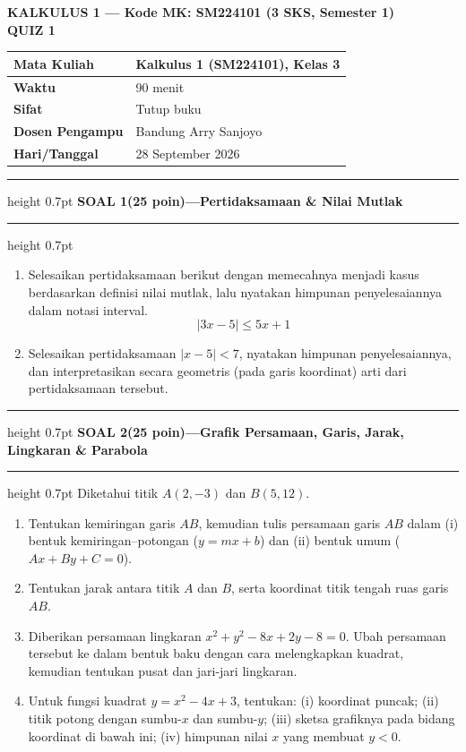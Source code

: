 \documentclass[11pt,a4paper]{article}
\newcommand{\judulsoal}[2]{%
  \par\addvspace{9pt}\hrule height 0.7pt
  \vspace{3pt}\textbf{SOAL #1\quad(25 poin)\quad---\quad #2}\par
  \vspace{2pt}\hrule height 0.7pt\vspace{4pt}}
\begin{document}
\thispagestyle{soal}
\begingroup
\fontsize{11}{13.5}\selectfont
{}
\setlength{\abovedisplayskip}{5pt}
\setlength{\belowdisplayskip}{5pt}

\begin{center}
  \textbf{KALKULUS 1 --- Kode MK: SM224101 (3 SKS, Semester 1)}\\[3pt]
  {\Large\textbf{QUIZ 1}}
\end{center}
\vspace{-5pt}
{\renewcommand{\arraystretch}{1.18}
  \begin{tabular}{|>{\bfseries}p{39mm}|p{\dimexpr\textwidth-39mm-4\tabcolsep-3\arrayrulewidth\relax}|}
    \hline
    Mata Kuliah    & Kalkulus 1 (SM224101), Kelas 3 \\ \hline
    Waktu          & 90 menit                       \\ \hline
    Sifat          & Tutup buku                     \\ \hline
    Dosen Pengampu & Bandung Arry Sanjoyo           \\ \hline
    Hari/Tanggal   & 28 September 2026              \\ \hline
  \end{tabular}}

\judulsoal{1}{Pertidaksamaan \& Nilai Mutlak}
\begin{enumerate}
  \item Selesaikan pertidaksamaan berikut dengan memecahnya menjadi kasus berdasarkan definisi nilai mutlak, lalu nyatakan himpunan penyelesaiannya dalam notasi interval.
        \[
          |3x-5|\le 5x+1
        \]
  \item Selesaikan pertidaksamaan $|x-5|<7$, nyatakan himpunan penyelesaiannya, dan interpretasikan secara geometris (pada garis koordinat) arti dari pertidaksamaan tersebut.
\end{enumerate}

\judulsoal{2}{Grafik Persamaan, Garis, Jarak, Lingkaran \& Parabola}
Diketahui titik $A(2,-3)$ dan $B(5,12)$.
\begin{enumerate}
  \item Tentukan kemiringan garis $AB$, kemudian tulis persamaan garis $AB$ dalam (i) bentuk kemiringan--potongan ($y=mx+b$) dan (ii) bentuk umum ($Ax+By+C=0$).
  \item Tentukan jarak antara titik $A$ dan $B$, serta koordinat titik tengah ruas garis $AB$.
  \item Diberikan persamaan lingkaran $x^2+y^2-8x+2y-8=0$.
        Ubah persamaan tersebut ke dalam bentuk baku dengan cara melengkapkan kuadrat, kemudian tentukan pusat dan jari-jari lingkaran.
  \item Untuk fungsi kuadrat $y=x^2-4x+3$, tentukan:
        (i) koordinat puncak; (ii) titik potong dengan sumbu-$x$ dan sumbu-$y$;
        (iii) sketsa grafiknya pada bidang koordinat di bawah ini;
        (iv) himpunan nilai $x$ yang membuat $y<0$.
\end{enumerate}
\end{document}
